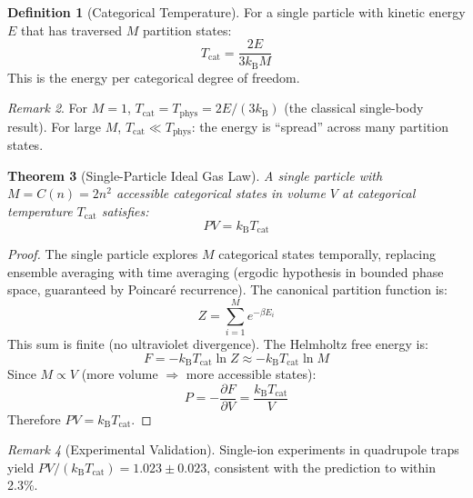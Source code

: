 \documentclass[twocolumn,10pt,a4paper]{article}
\theoremstyle{plain}
\newtheorem{theorem}{Theorem}[section]
\theoremstyle{definition}
\newtheorem{definition}[theorem]{Definition}
\theoremstyle{remark}
\newtheorem{remark}[theorem]{Remark}
\newcommand{\kB}{k_{\mathrm{B}}}
\begin{document}
\begin{definition}[Categorical Temperature]
\label{def:cat_temp}
For a single particle with kinetic energy $E$ that has traversed $M$ partition states:
\begin{equation}
    T_{\mathrm{cat}} = \frac{2E}{3\kB M}
\end{equation}
This is the energy per categorical degree of freedom.
\end{definition}

\begin{remark}
For $M = 1$, $T_{\mathrm{cat}} = T_{\mathrm{phys}} = 2E/(3\kB)$ (the classical single-body result). For large $M$, $T_{\mathrm{cat}} \ll T_{\mathrm{phys}}$: the energy is ``spread'' across many partition states.
\end{remark}

\begin{theorem}[Single-Particle Ideal Gas Law]
\label{thm:single_gas}
A single particle with $M = C(n) = 2n^2$ accessible categorical states in volume $V$ at categorical temperature $T_{\mathrm{cat}}$ satisfies:
\begin{equation}
\boxed{PV = \kB T_{\mathrm{cat}}}
\end{equation}
\end{theorem}

\begin{proof}
The single particle explores $M$ categorical states temporally, replacing ensemble averaging with time averaging (ergodic hypothesis in bounded phase space, guaranteed by Poincar\'{e} recurrence). The canonical partition function is:
\begin{equation}
    Z = \sum_{i=1}^{M} e^{-\beta E_i}
\end{equation}
This sum is finite (no ultraviolet divergence). The Helmholtz free energy is:
\begin{equation}
    F = -\kB T_{\mathrm{cat}} \ln Z \approx -\kB T_{\mathrm{cat}} \ln M
\end{equation}
Since $M \propto V$ (more volume $\Rightarrow$ more accessible states):
\begin{equation}
    P = -\frac{\partial F}{\partial V} = \frac{\kB T_{\mathrm{cat}}}{V}
\end{equation}
Therefore $PV = \kB T_{\mathrm{cat}}$.
\end{proof}

\begin{remark}[Experimental Validation]
Single-ion experiments in quadrupole traps yield $PV/(\kB T_{\mathrm{cat}}) = 1.023 \pm 0.023$, consistent with the prediction to within 2.3\%.
\end{remark}
\end{document}
